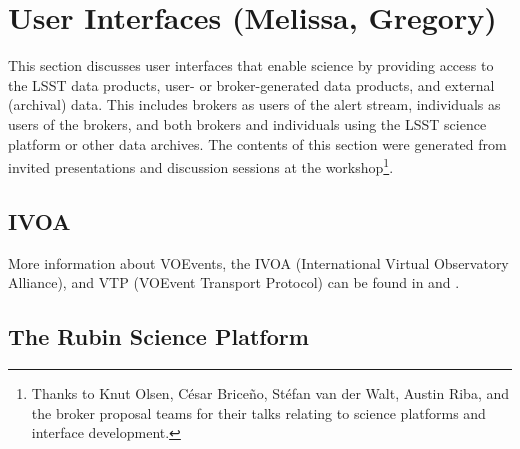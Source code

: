 \section{User Interfaces (Melissa, Gregory)} \label{sec:interfaces}



This section discusses user interfaces that enable science by providing access to the \gls{LSST} data products, user- or broker-generated data products, and external (archival) data.
This includes brokers as users of the alert stream, individuals as users of the brokers, and both brokers and individuals using the \gls{LSST} science platform or other data archives.
The contents of this section were generated from invited presentations and discussion sessions at the workshop\footnote{Thanks to Knut Olsen, César Briceño, Stéfan van der Walt, Austin Riba, and the broker proposal teams for their talks relating to science platforms and interface development.}.

\subsection{IVOA}\label{ssec:interfaces_ivoa}


More information about VOEvents, the \gls{IVOA} (International Virtual Observatory Alliance), and \gls{VTP} (VOEvent Transport Protocol) can be found in \citet{2011ivoa.spec.0711S} and \citet{2017arXiv170901264A}.


\subsection{The Rubin \gls{Science Platform}}\label{ssec:interfaces_rsp}

